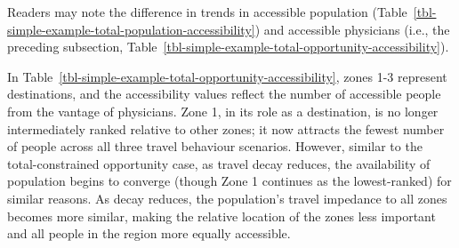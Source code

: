 \documentclass[
  10pt,
  letterpaper,
]{article}
\begin{document}
\begin{table}

\caption{\label{tbl-simple-example-total-population-accessibility}Simple
system: Total-constrained accessible population.}


\end{table}%

Readers may note the difference in trends in accessible population
(Table~\ref{tbl-simple-example-total-population-accessibility}) and
accessible physicians (i.e., the preceding subsection,
Table~\ref{tbl-simple-example-total-opportunity-accessibility}).

In Table~\ref{tbl-simple-example-total-opportunity-accessibility}, zones
1-3 represent destinations, and the accessibility values reflect the
number of accessible people from the vantage of physicians. Zone 1, in
its role as a destination, is no longer intermediately ranked relative
to other zones; it now attracts the fewest number of people across all
three travel behaviour scenarios. However, similar to the
total-constrained opportunity case, as travel decay reduces, the
availability of population begins to converge (though Zone 1 continues
as the lowest-ranked) for similar reasons. As decay reduces, the
population's travel impedance to all zones becomes more similar, making
the relative location of the zones less important and all people in the
region more equally accessible.
\end{document}
